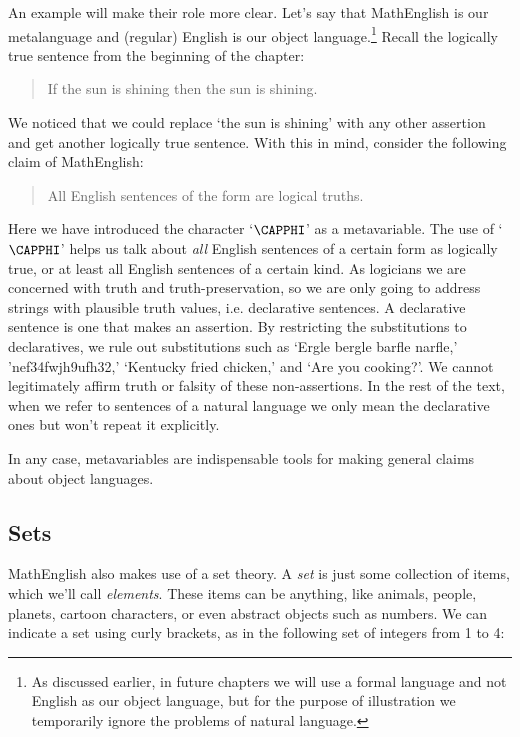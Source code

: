 An example will make their role more clear.  Let's say that MathEnglish is our metalanguage and (regular) English is our object language.\footnote{As discussed earlier, in future chapters we will use a formal language and not English as our object language, but for the purpose of illustration we temporarily ignore the problems of natural language.}  Recall the logically true sentence from the beginning of the chapter:

\begin{quote}
\noindent{}If the sun is shining then the sun is shining.
\end{quote}

\noindent{}We noticed that we could replace `the sun is shining' with any other assertion and get another logically true sentence.  With this in mind, consider the following claim of MathEnglish: 

\noindent{}\begin{quote}All English sentences of the form  are logical truths.\end{quote}

\noindent{}Here we have introduced the character `$\CAPPHI$' as a metavariable. The use of `$\CAPPHI$' helps us talk about \emph{all} English sentences of a certain form as logically true, or at least all English sentences of a certain kind. 
As logicians we are concerned with truth and truth-preservation, so we are only going to address strings with plausible truth values, i.e. declarative sentences. 
A declarative sentence is one that makes an assertion. 
By restricting the substitutions to declaratives, we rule out substitutions such as `Ergle bergle barfle narfle,' 'nef34fwjh9ufh32,' `Kentucky fried chicken,' and `Are you cooking?'. 
We cannot legitimately affirm truth or falsity of these non-assertions. 
In the rest of the text, when we refer to  sentences of a natural language we only mean the declarative ones but won't repeat it explicitly.

In any case, metavariables are indispensable tools for making general claims about object languages.


\subsection{Sets}\label{sets}

MathEnglish also makes use of a set theory.  A \emph{set} is just some collection of items, which we'll call \emph{elements}. These items can be anything, like animals, people, planets, cartoon characters, or even abstract objects such as numbers.  We can indicate a set using curly brackets, as in the following set of integers from 1 to 4:


